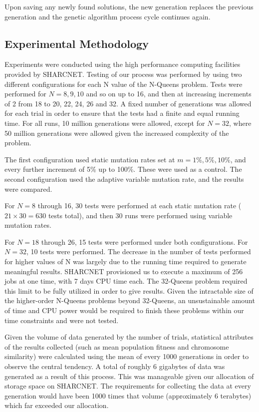\documentclass{sig-alternate}
\begin{document}
Upon saving any newly found solutions, the new generation replaces the previous generation and the genetic algorithm process cycle continues again.

\subsection{Experimental Methodology}
Experiments were conducted using the high performance computing facilities provided by SHARCNET. Testing of our process was performed by using two different configurations for each N value of the N-Queens problem. Tests were performed for $N = 8, 9, 10$ and so on up to 16, and then at increasing increments of 2 from 18 to 20, 22, 24, 26 and 32. A fixed number of generations was allowed for each trial in order to ensure that the tests had a finite and equal running time. For all runs, 10 million generations were allowed, except for $N = 32$, where 50 million generations were allowed given the increased complexity of the problem.

The first configuration used static mutation rates set at $m = 1\%, 5\%, 10\%$, and every further increment of 5\% up to 100\%. These were used as a control. The second configuration used the adaptive variable mutation rate, and the results were compared. 

For $N = 8$ through 16, 30 tests were performed at each static mutation rate ($21 \times 30 = 630$ tests total), and then 30 runs were performed using variable mutation rates. 

For $N = 18$ through 26, 15 tests were performed under both configurations. For $N = 32$, 10 tests were performed. The decrease in the number of tests performed for higher values of N was largely due to the running time required to generate meaningful results. SHARCNET provisioned us to execute a maximum of 256 jobs at one time, with 7 days CPU time each. The 32-Queens problem required this limit to be fully utilized in order to give results. Given the intractable size of the higher-order N-Queens problems beyond 32-Queens, an unsustainable amount of time and CPU power would be required to finish these problems within our time constraints and were not tested.

Given the volume of data generated by the number of trials, statistical attributes of the results collected (such as mean population fitness and chromosome similarity) were calculated using the mean of every 1000 generations in order to observe the central tendency. A total of roughly 6 gigabytes of data was generated as a result of this process. This was manageable given our allocation of storage space on SHARCNET. The requirements for collecting the data at every generation would have been 1000 times that volume (approximately 6 terabytes) which far exceeded our allocation.
\end{document}
